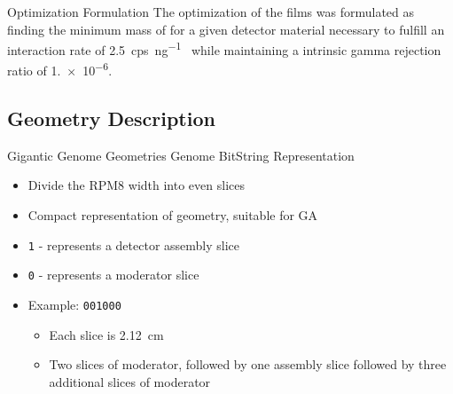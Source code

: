 \begin{frame}{Optimization Formulation}
The optimization of the films was formulated as finding the minimum mass of  for a given detector material necessary to fulfill an interaction rate of \SI{2.5}{cps\per\nano\gram{}} while maintaining a intrinsic gamma rejection ratio of \num{1.e-6}.
\end{frame}
\subsection{Geometry Description}
\begin{frame}[fragile]{Gigantic Genome Geometries}
Genome BitString Representation
\begin{itemize}
  \item Divide the RPM8 width into even slices
  \item Compact representation of geometry, suitable for GA
  \item \verb+1+ - represents a detector assembly slice
  \item \verb+0+ - represents a moderator slice
  \item Example: \verb+001000+
  \begin{itemize}
    \item Each slice is \SI{2.12}{\centi\meter}
    \item Two slices of moderator, followed by one assembly slice followed by three additional slices of moderator
  \end{itemize}
\end{itemize}
\end{frame}
